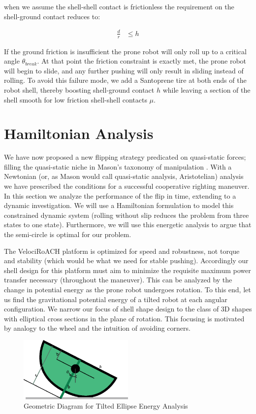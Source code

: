 \documentclass[letterpaper]{report}
\begin{document}
when we assume the shell-shell contact is frictionless the requirement on the shell-ground contact reduces to:

\begin{align}
  \frac{d}{r} &\leq h
\end{align}

If the ground friction is insufficient the prone robot will only roll up to a critical angle $\theta_{break}$.
At that point the friction constraint is exactly met, the prone robot will begin to slide, and any further pushing will only result in sliding instead of rolling.
To avoid this failure mode, we add a Santoprene tire at both ends of the robot shell, thereby boosting shell-ground contact $h$ while leaving a section of the shell smooth for low friction shell-shell contacts $\mu$.

\section{Hamiltonian Analysis \label{sec:QS_HamAnalysis}}
We have now proposed a new flipping strategy predicated on quasi-static forces; filling the quasi-static niche in Mason's taxonomy of manipulation \cite{MasonMORMBook}.
With a Newtonian (or, as Mason would call quasi-static analysis, Aristotelian) analysis we have prescribed the conditions for a successful cooperative righting maneuver.
In this section we analyze the performance of the flip in time, extending to a dynamic investigation.
We will use a Hamiltonian formulation to model this constrained dynamic system (rolling without slip reduces the problem from three states to one state).
Furthermore, we will use this energetic analysis to argue that the semi-circle is optimal for our problem.

The VelociRoACH platform is optimized for speed and robustness, not torque and stability (which would be what we need for stable pushing).
Accordingly our shell design for this platform must aim to minimize the requisite maximum power transfer necessary (throughout the maneuver).
This can be analyzed by the change in potential energy as the prone robot undergoes rotation.
To this end, let us find the gravitational potential energy of a tilted robot at each angular configuration.
We narrow our focus of shell shape design to the class of 3D shapes with elliptical cross sections in the plane of rotation.
This focusing is motivated by analogy to the wheel and the intuition of avoiding corners.

\begin{figure}[ht]
\centering
\includegraphics[width=0.5\textwidth]{QS_EnergyAnalysis.eps}
\caption{\label{f:QS_energyGeometry}Geometric Diagram for Tilted Ellipse Energy Analysis}
\end{figure}
\end{document}
